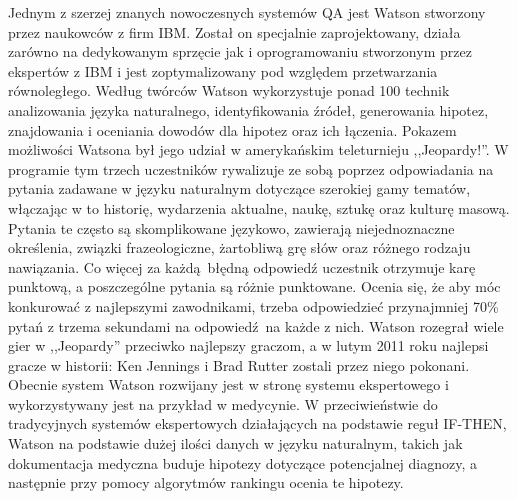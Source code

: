 \documentclass[a4paper, twoside, 12pt]{report}
\begin{document}
            Jednym z szerzej znanych nowoczesnych systemów QA jest Watson stworzony przez naukowców z firm IBM.
            Został on specjalnie zaprojektowany, działa zarówno na dedykowanym sprzęcie jak i oprogramowaniu stworzonym
            przez ekspertów z IBM i jest zoptymalizowany pod względem przetwarzania równoległego.
            Według twórców Watson wykorzystuje ponad 100 technik analizowania języka naturalnego, identyfikowania źródeł,
            generowania hipotez, znajdowania i oceniania dowodów dla hipotez oraz ich łączenia\cite{WATSON}.
            Pokazem możliwości Watsona był jego udział w amerykańskim teleturnieju ,,Jeopardy!''. W programie tym
            trzech uczestników rywalizuje ze sobą poprzez odpowiadania na pytania zadawane w języku naturalnym dotyczące
            szerokiej gamy tematów, włączając w to historię, wydarzenia aktualne, naukę, sztukę oraz kulturę masową.
            Pytania te często są skomplikowane językowo, zawierają niejednoznaczne określenia, związki frazeologiczne,
            żartobliwą grę słów oraz różnego rodzaju nawiązania.
            Co więcej za każdą błędną odpowiedź uczestnik otrzymuje karę punktową, a poszczególne pytania są różnie
            punktowane. Ocenia się, że aby móc konkurować z najlepszymi zawodnikami, trzeba odpowiedzieć przynajmniej
            70\% pytań z trzema sekundami na odpowiedź na każde z nich. Watson rozegrał wiele gier w ,,Jeopardy'' przeciwko
            najlepszy graczom, a w lutym 2011 roku najlepsi gracze w historii: Ken Jennings i Brad Rutter zostali przez
            niego pokonani. Obecnie system Watson rozwijany jest w stronę systemu ekspertowego i wykorzystywany jest na
            przykład w medycynie. W przeciwieństwie do tradycyjnych systemów ekspertowych działających na podstawie
            reguł IF-THEN, Watson na podstawie dużej ilości danych w języku naturalnym, takich jak  dokumentacja medyczna
            buduje hipotezy dotyczące potencjalnej diagnozy, a następnie przy pomocy algorytmów rankingu ocenia te
            hipotezy\cite{WATSONMEDICINE}.
\end{document}
